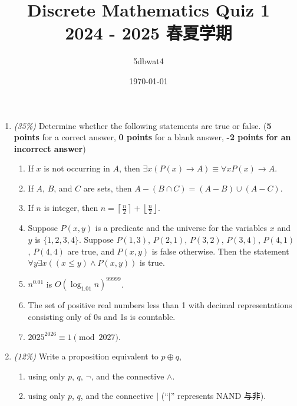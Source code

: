 \documentclass{article}
\title{Discrete Mathematics Quiz 1\\\small{2024 - 2025 春夏学期}}
\author{5dbwat4}
\date{\today}
\begin{document}
\maketitle


\begin{enumerate}
\def\labelenumi{\arabic{enumi}.}
\item
  \emph{(35\%)} Determine whether the following statements are true or
  false. (\textbf{5 points} for a correct answer, \textbf{0 points} for
  a blank answer, \textbf{-2 points for an incorrect answer})

\begin{enumerate}
\def\labelenumi{\alph{enumi})}
\item
  If \(x\) is not occurring in \(A\), then
  \(\exists x(P(x)\to A)\equiv \forall x P(x) \to A\).
\item
  If \(A\), \(B\), and \(C\) are sets, then
  \(A-(B\cap C)=(A - B)\cup(A - C)\).
\item
  If \(n\) is integer, then
  \(n=\left\lceil\frac{n}{2}\right\rceil+\left\lfloor\frac{n}{2}\right\rfloor\).
\item
  Suppose \(P(x,y)\) is a predicate and the universe for the variables
  \(x\) and \(y\) is \(\{1,2,3,4\}\). Suppose \(P(1,3)\), \(P(2,1)\),
  \(P(3,2)\), \(P(3,4)\), \(P(4,1)\), \(P(4,4)\) are true, and
  \(P(x,y)\) is false otherwise. Then the statement
  \(\forall y\exists x((x\leq y)\land P(x,y))\) is true.
\item
  \(n^{0.01}\) is \(O(\log_{1.01}{n})^{99999}\).
\item
  The set of positive real numbers less than 1 with decimal
  representations consisting only of 0s and 1s is countable.
\item
  \(2025^{2026}\equiv1\pmod{2027}\).
\end{enumerate}

\item
  \emph{(12\%)} Write a proposition equivalent to \(p\oplus q\),

\begin{enumerate}
\def\labelenumi{\alph{enumi})}
\item
  using only \(p\), \(q\), \(\neg\), and the connective \(\land\).
\item
  using only \(p\), \(q\), and the connective \(|\) (``\(|\)''
  represents NAND 与非).
\end{enumerate}


\end{enumerate}
\end{document}
